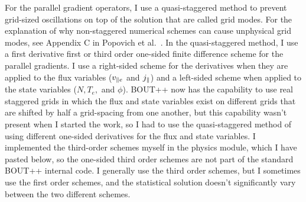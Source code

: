 For the parallel gradient operators, I use a quasi-staggered method to prevent grid-sized oscillations on top of the solution that are called grid modes. 
For the explanation of why non-staggered numerical schemes can cause unphysical grid modes, see Appendix C in Popovich et al.~\cite{popovich2010b}.
In the quasi-staggered method, I use a first derivative first or third order one-sided finite difference scheme for the parallel gradients. I use a right-sided scheme for the derivatives when
they are applied to the flux variables ($v_{\parallel e}$ and $j_\parallel$) and a left-sided scheme when applied to the state variables ($N, T_e,$ and $\phi$). BOUT++ now has the capability to use real
staggered grids in which the flux and state variables exist on different grids that are shifted by half a grid-spacing from one another, but this capability wasn't present when I started
the work, so I had to use the quasi-staggered method of using different one-sided derivatives for the flux and state variables. I implemented the third-order schemes myself in the physics module,
which I have pasted below, so the one-sided third order schemes are not part of the standard BOUT++ internal code. I generally use the third order schemes, but I sometimes use the first order
schemes, and the statistical solution doesn't significantly vary between the two different schemes.

